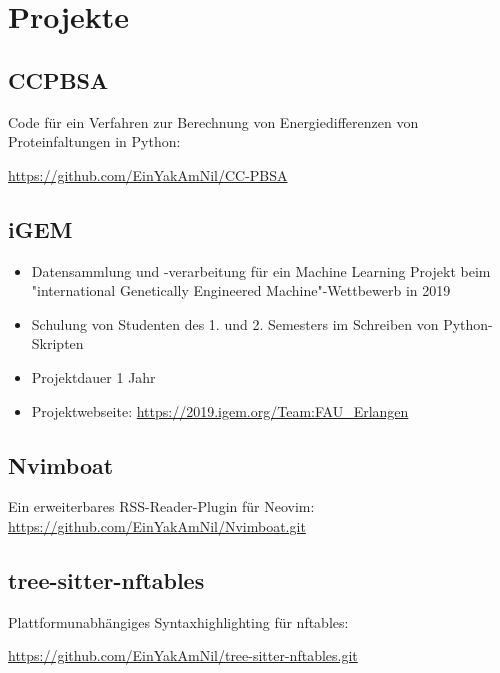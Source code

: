 \documentclass{article}
\begin{document}
\section{Projekte}

\subsection{CCPBSA}
Code für ein Verfahren zur Berechnung von Energiedifferenzen von Proteinfaltungen in Python:

\href{https://github.com/EinYakAmNil/CC-PBSA}{https://github.com/EinYakAmNil/CC-PBSA}

\subsection{iGEM}
\begin{itemize}
\item Datensammlung und -verarbeitung für ein Machine Learning Projekt beim "international Genetically Engineered Machine"-Wettbewerb in 2019
\item Schulung von Studenten des 1. und 2. Semesters im Schreiben von Python-Skripten
\item Projektdauer 1 Jahr
\item Projektwebseite: \href{https://2019.igem.org/Team:FAU_Erlangen}{https://2019.igem.org/Team:FAU\_Erlangen}
\end{itemize}

\subsection{Nvimboat}
Ein erweiterbares RSS-Reader-Plugin für Neovim: \href{https://github.com/EinYakAmNil/Nvimboat.git}{https://github.com/EinYakAmNil/Nvimboat.git}

\subsection{tree-sitter-nftables}
Plattformunabhängiges Syntaxhighlighting für nftables:

\href{https://github.com/EinYakAmNil/tree-sitter-nftables.git}{https://github.com/EinYakAmNil/tree-sitter-nftables.git}
\end{document}
